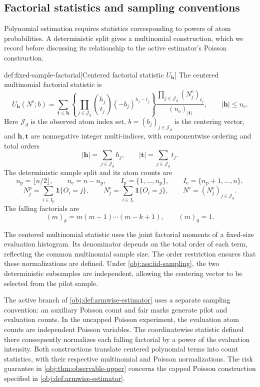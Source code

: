 \documentclass[11pt]{article}
\begin{document}
\subsection{Factorial statistics and sampling conventions}

Polynomial estimation requires statistics corresponding to powers of atom probabilities. A deterministic split gives a multinomial construction, which we record before discussing its relationship to the active estimator's Poisson construction.

\begin{definitionv}{def:fixed-sample-factorial}[Centered factorial statistic \(U_{\boldsymbol h}\)]
The centered multinomial factorial statistic is
\[
U_{\boldsymbol h}(N^{\mathrm e};b)
=
\sum_{\boldsymbol t\le\boldsymbol h}
\left\{
\prod_{j\in\mathcal J_d}
\binom{h_j}{t_j}(-b_j)^{h_j-t_j}
\right\}
\frac{\prod_{j\in\mathcal J_d}(N_j^{\mathrm e})_{t_j}}
{(n_{\mathrm e})_{|\boldsymbol t|}},
\qquad
|\boldsymbol h|\le n_{\mathrm e}.
\]
Here \(\mathcal J_d\) is the observed atom index set, \(b=(b_j)_{j\in\mathcal J_d}\) is the centering vector, and \(\boldsymbol h,\boldsymbol t\) are nonnegative integer multi-indices, with componentwise ordering and total orders
\[
|\boldsymbol h|=\sum_{j\in\mathcal J_d}h_j,
\qquad
|\boldsymbol t|=\sum_{j\in\mathcal J_d}t_j.
\]
The deterministic sample split and its atom counts are
\[
n_{\mathrm p}=\lfloor n/2\rfloor,
\qquad
n_{\mathrm e}=n-n_{\mathrm p},
\qquad
I_{\mathrm p}=\{1,\ldots,n_{\mathrm p}\},
\qquad
I_{\mathrm e}=\{n_{\mathrm p}+1,\ldots,n\},
\]
\[
N_j^{\mathrm p}
=\sum_{i\in I_{\mathrm p}}\mathbf 1\{O_i=j\},
\qquad
N_j^{\mathrm e}
=\sum_{i\in I_{\mathrm e}}\mathbf 1\{O_i=j\},
\qquad
N^{\mathrm e}=(N_j^{\mathrm e})_{j\in\mathcal J_d}.
\]
The falling factorials are
\[
(m)_k=m(m-1)\cdots(m-k+1),
\qquad
(m)_0=1.
\]
\end{definitionv}

The centered multinomial statistic  uses the joint factorial moments of a fixed-size evaluation histogram. Its denominator depends on the total order of each term, reflecting the common multinomial sample size. The order restriction ensures that these normalizations are defined. Under \cref{obj:ass:iid-sampling}, the two deterministic subsamples are independent, allowing the centering vector to be selected from the pilot sample.

The active branch of \cref{obj:def:armwise-estimator} uses a separate sampling convention: an auxiliary Poisson count and fair marks generate pilot and evaluation counts. In the uncapped Poisson experiment, the evaluation atom counts are independent Poisson variables. The coordinatewise statistic defined there consequently normalizes each falling factorial by a power of the evaluation intensity. Both constructions translate centered polynomial terms into count statistics, with their respective multinomial and Poisson normalizations. The risk guarantee in \cref{obj:thm:observable-upper} concerns the capped Poisson construction specified in \cref{obj:def:armwise-estimator}.
\end{document}
